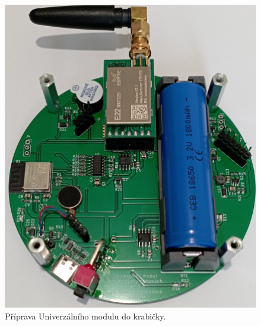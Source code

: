 \begin{figure}[!h]
	\begin{center}
	  \includegraphics[scale=0.29]{obrazky/chystani_do_krabicky.jpg}
	\end{center}
	\caption[Příprava Univerzálního modulu do krabičky]{Příprava Univerzálního modulu do krabičky.}
\end{figure}

